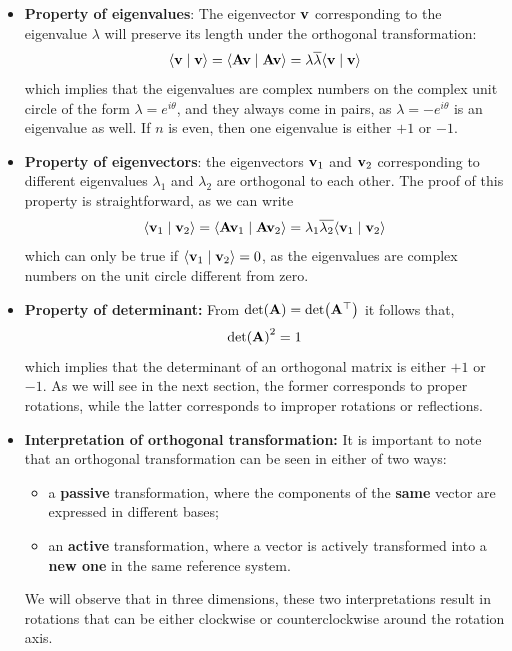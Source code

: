 \documentclass[12pt]{article}
\newcommand{\ip}[2]{\langle #1 \mid #2 \rangle}
\begin{document}
\begin{itemize}
  \item \textbf{Property of eigenvalues}: The eigenvector $\vb{v}$ corresponding to the
        eigenvalue $\lambda$ will preserve its length under the orthogonal transformation:
        \begin{equation}
          \ip{\vb{v}}{\vb{v}} = \ip{\vb{A}\vb{v}}{\vb{A}\vb{v}} = \lambda\overline{\lambda}\ip{\vb{v}}{\vb{v}}
        \end{equation}
        which implies that the eigenvalues are complex numbers on the complex unit circle of
        the form $\lambda = e^{i\theta}$, and they always come in pairs, as
        $\lambda = -e^{i\theta}$ is an eigenvalue as well. If $n$ is even, then one eigenvalue
        is either $+1$ or $-1$.

  \item \textbf{Property of eigenvectors}: the eigenvectors $\vb{v}_1$ and $\vb{v}_2$
        corresponding to different eigenvalues $\lambda_1$ and $\lambda_2$ are orthogonal to
        each other. The proof of this property is straightforward, as we can write
        \begin{equation}
          \ip{\vb{v}_1}{\vb{v}_2} = \ip{\vb{A}\vb{v}_1}{\vb{A}\vb{v}_2} = \lambda_1\overline{\lambda_2}\ip{\vb{v}_1}{\vb{v}_2}
        \end{equation}
        which can only be true if $\ip{\vb{v}_1}{\vb{v}_2} = 0$, as the eigenvalues are
        complex numbers on the unit circle different from zero.

  \item \textbf{Property of determinant:} From $\det(\vb{A}) = \det(\vb{A}^\top)$ it follows
        that,
        \begin{equation}
          \det(\vb{A})^2 = 1
        \end{equation}
        which implies that the determinant of an orthogonal matrix is either $+1$ or $-1$.
        As we will see in the next section, the former corresponds to proper rotations, while
        the latter corresponds to improper rotations or reflections.

  \item \textbf{Interpretation of orthogonal transformation:} It is important to note that
        an orthogonal transformation can be seen in either of two ways:
        \begin{itemize}
          \item a \textbf{passive} transformation, where the components of the \textbf{same}
                vector are expressed in different bases;
          \item an \textbf{active} transformation, where a vector is actively transformed into
                a \textbf{new one} in the same reference system.
        \end{itemize}
        We will observe that in three dimensions, these two interpretations result in rotations
        that can be either clockwise or counterclockwise around the rotation axis.
\end{itemize}
\end{document}
